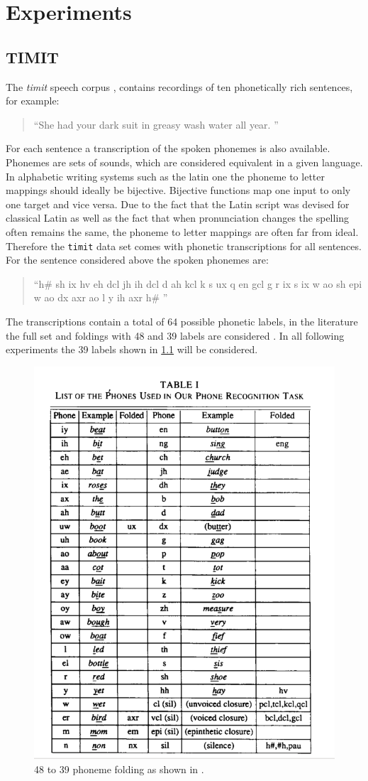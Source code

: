 \chapter{Experiments}
\section{TIMIT}
The \textit{timit} speech corpus \cite{Garofolo1993}, contains recordings of ten phonetically rich sentences, for example:
\begin{quotation}
\textquotedblleft She had your dark suit in greasy wash water all year. \textquotedblright
\end{quotation}
For each sentence a transcription of the spoken phonemes is also available. Phonemes are sets of sounds, which
are considered equivalent in a given language. In alphabetic writing systems such as the latin one the phoneme to letter mappings should ideally be bijective. Bijective functions map one input to only one target and vice versa. Due to the fact that the Latin script was devised for classical Latin as well as the fact that when pronunciation changes the spelling often remains the same, the phoneme to letter mappings are often far from ideal. Therefore the \texttt{timit} data set comes with phonetic transcriptions for all sentences. For the sentence considered above the spoken phonemes are:
\begin{quotation}
\textquotedblleft h\# sh ix hv eh dcl jh ih dcl d ah kcl k s ux q en gcl g r ix s ix w ao sh epi w ao dx axr ao l y ih axr h\# \textquotedblright
\end{quotation}
The transcriptions contain a total of 64 possible phonetic labels, in the literature the full set and foldings with 48 and 39 labels are considered \cite{Lee1989}. In all following experiments the 39 labels shown in \ref{fig:phoneTable} will be considered.

\begin{figure}
\centering
\includegraphics[width=0.7\linewidth]{png/phoneTable}
\caption{48 to 39 phoneme folding as shown in \cite{Lee1989}.}
\label{fig:phoneTable}
\end{figure}

